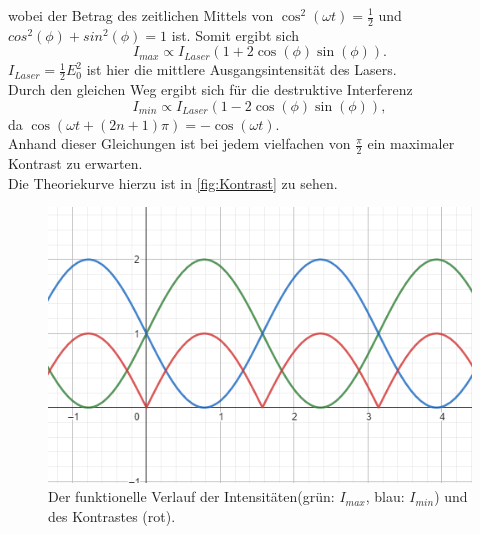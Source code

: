 wobei der Betrag des zeitlichen Mittels von $\cos^2{(\omega t)} = \frac{1}{2}$ und $cos^2{(\phi)} + sin^2{(\phi)} = 1$ ist. Somit ergibt sich
\begin{equation}
    I_{max} \propto I_{Laser} \left( 1 + 2 \cos{(\phi)}\sin{(\phi)} \right).
\end{equation}
$I_{Laser} = \frac{1}{2} E_0^2$ ist hier die mittlere Ausgangsintensität des Lasers.\\
Durch den gleichen Weg ergibt sich für die destruktive Interferenz
\begin{equation}
    I_{min} \propto I_{Laser} \left( 1 - 2 \cos{(\phi)}\sin{(\phi)} \right),
\end{equation}
da $\cos{(\omega t + (2n+1)\pi)} = -\cos{(\omega t)} $.\\
Anhand dieser Gleichungen ist bei jedem vielfachen von $\frac{\pi}{2}$ ein maximaler Kontrast zu erwarten.\\
Die Theoriekurve hierzu ist in \autoref{fig:Kontrast} zu sehen.
 
\begin{figure}
    \centering
    \includegraphics[scale=0.4]{content/V64_pictures/Kontrast.png}
    \caption{Der funktionelle Verlauf der Intensitäten(grün: $I_{max}$, blau: $I_{min}$) und des Kontrastes (rot).}
    \label{fig:Kontrast}
\end{figure}

